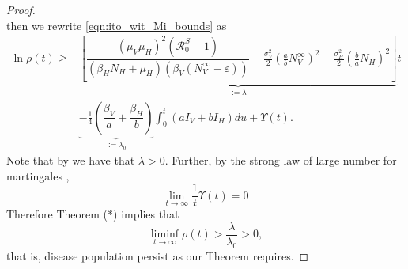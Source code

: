\begin{proof}
$$    $$
    then we rewrite \eqref{eqn:ito_wit_Mi_bounds} as
    \begin{equation} \label{eqn:ito_wit_Mi_bounds_new_notation}
        \begin{aligned}
            \ln \rho(t) 
            \geq &
                \underbrace{
                    \left[
                        \dfrac{
                            (\mu_V \mu_H) ^ 2 (\mathcal{R}_0 ^ S - 1)
                        }{
                            (\beta_H N_H + \mu_H) 
                            (\beta_V \left(N_V ^ {\infty} -\varepsilon\right))
                        }
                        -
                        \frac{\sigma_V ^ 2}{2}
                        \left(
                            \frac{a}{b} N_V ^ \infty
                        \right) ^2
                        -
                        \frac{\sigma_H ^ 2}{2}
                        \left(
                            \frac{b}{a}
                            N_H
                        \right) ^ 2
                    \right]
                }_{:= \lambda}
                t
            \\
            &
            \underbrace{
                -\frac{1}{4}
                \left(
                    \dfrac{\beta_V}{a}
                    +
                    \dfrac{\beta_H}{b}
                \right)
            }_{:= \lambda_0}
            \int_{0} ^ t
                \left(
                    a I_V + b I_H
                \right)
                du
            +
            \varUpsilon(t).
        \end{aligned}
    \end{equation}
    Note that by  we have that $\lambda > 0$.
    Further, by the strong law of large number for martingales \cite{Mao2007},
    $$
        \lim_{t \to \infty}
            \frac{1}{t}
            \varUpsilon (t) =0
    $$
    Therefore Theorem (*) implies that
    $$
        \liminf_{t \to \infty} \rho(t) > \dfrac{ \lambda }{ \lambda_0} >0,
    $$
    that is, disease population persist as our Theorem requires.
\end{proof}
